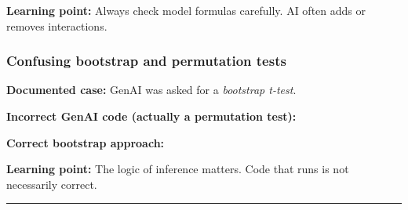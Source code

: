 \documentclass[
  letterpaper,
  8pt,
  a4paper]{book}
\newenvironment{Shaded}{\begin{snugshade}}{\end{snugshade}}
\newcommand{\AttributeTok}[1]{\textcolor[rgb]{0.40,0.45,0.13}{#1}}
\newcommand{\ConstantTok}[1]{\textcolor[rgb]{0.56,0.35,0.01}{#1}}
\newcommand{\DecValTok}[1]{\textcolor[rgb]{0.68,0.00,0.00}{#1}}
\newcommand{\FunctionTok}[1]{\textcolor[rgb]{0.28,0.35,0.67}{#1}}
\newcommand{\NormalTok}[1]{\textcolor[rgb]{0.00,0.23,0.31}{#1}}
\newcommand{\OtherTok}[1]{\textcolor[rgb]{0.00,0.23,0.31}{#1}}
\newcommand{\SpecialCharTok}[1]{\textcolor[rgb]{0.37,0.37,0.37}{#1}}
\begin{document}
\textbf{Learning point:} Always check model formulas carefully. AI often
adds or removes interactions.

\subsubsection*{Confusing bootstrap and permutation
tests}\label{confusing-bootstrap-and-permutation-tests}

\textbf{Documented case:} GenAI was asked for a \emph{bootstrap t-test}.

\textbf{Incorrect GenAI code (actually a permutation test):}

\begin{Shaded}
\end{Shaded}

\textbf{Correct bootstrap approach:}

\begin{Shaded}
\end{Shaded}

\textbf{Learning point:} The logic of inference matters. Code that runs
is not necessarily correct.

\begin{center}\rule{0.5\linewidth}{0.5pt}\end{center}
\end{document}
